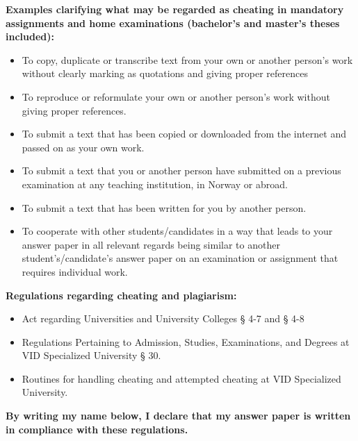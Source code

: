 \begin{scriptsize}

\noindent
\textbf{Examples clarifying what may be regarded as cheating in mandatory
assignments and home examinations (bachelor's and master's theses
included):}
\begin{itemize}[leftmargin=0.5cm]
\item To copy, duplicate or transcribe text from your own or another person's
	work without clearly marking as quotations and giving proper references
\item To reproduce or reformulate your own or another person's work without
	giving proper references.
\item To submit a text that has been copied or downloaded from the internet and
	passed on as your own work.
\item To submit a text that you or another person have submitted on a previous
	examination at any teaching institution, in Norway or abroad.
\item To submit a text that has been written for you by another person.
\item To cooperate with other students/candidates in a way that leads to your
	answer paper in all relevant regards being similar to another
	student's/candidate's answer paper on an examination or assignment that
	requires individual work.
\end{itemize}

\noindent
\textbf{Regulations regarding cheating and plagiarism:}
\begin{itemize}[leftmargin=0.5cm]
\item Act regarding Universities and University Colleges § 4-7 and § 4-8
\item Regulations Pertaining to Admission, Studies, Examinations, and Degrees at
	VID Specialized University § 30.
\item Routines for handling cheating and attempted cheating at VID Specialized
	University.
\end{itemize}

\noindent
\textbf{By writing my name below, I declare that my answer paper is written in
compliance with these regulations.}
\end{scriptsize}

\begin{center}
	\vspace*{\fill}
	\vspace*{\fill}
\end{center}
